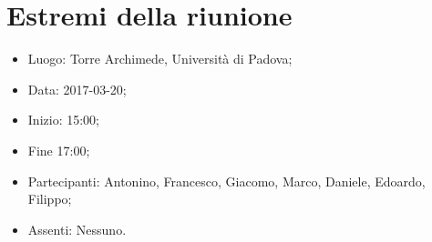 \documentclass[../verbale-2017-03-20.tex]{subfiles}
\begin{document}
\section{Estremi della riunione}
	\begin{itemize}
		\item Luogo: Torre Archimede, Università di Padova;
        \item Data: 2017-03-20;
        \item Inizio: 15:00;
        \item Fine 17:00;
		\item Partecipanti: Antonino, Francesco, Giacomo, Marco, Daniele, Edoardo, Filippo;
        \item Assenti: Nessuno.
	\end{itemize}
\end{document}
